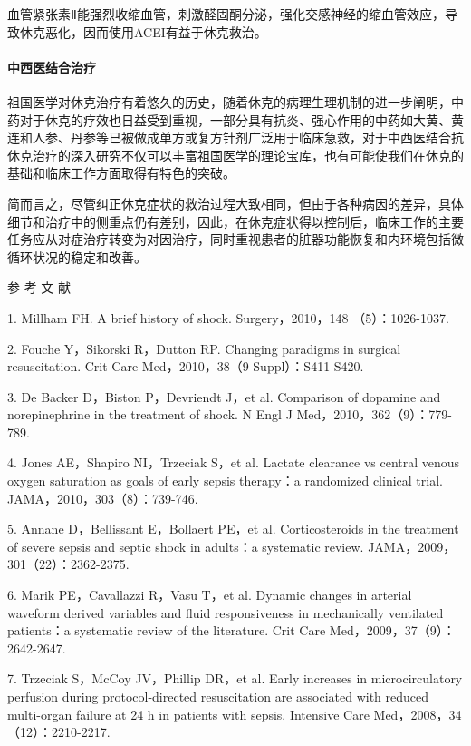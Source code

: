 血管紧张素Ⅱ能强烈收缩血管，刺激醛固酮分泌，强化交感神经的缩血管效应，导致休克恶化，因而使用ACEI有益于休克救治。

\paragraph{中西医结合治疗}

祖国医学对休克治疗有着悠久的历史，随着休克的病理生理机制的进一步阐明，中药对于休克的疗效也日益受到重视，一部分具有抗炎、强心作用的中药如大黄、黄连和人参、丹参等已被做成单方或复方针剂广泛用于临床急救，对于中西医结合抗休克治疗的深入研究不仅可以丰富祖国医学的理论宝库，也有可能使我们在休克的基础和临床工作方面取得有特色的突破。

简而言之，尽管纠正休克症状的救治过程大致相同，但由于各种病因的差异，具体细节和治疗中的侧重点仍有差别，因此，在休克症状得以控制后，临床工作的主要任务应从对症治疗转变为对因治疗，同时重视患者的脏器功能恢复和内环境包括微循环状况的稳定和改善。

\protect\hypertarget{text00056.html}{}{}

\hypertarget{text00056.htmlux5cux23CHP2-1-4}{}
参 考 文 献

1. Millham FH. A brief history of shock. Surgery，2010，148
（5）：1026-1037.

2. Fouche Y，Sikorski R，Dutton RP. Changing paradigms in surgical
resuscitation. Crit Care Med，2010，38（9 Suppl）：S411-S420.

3. De Backer D，Biston P，Devriendt J，et al. Comparison of dopamine and
norepinephrine in the treatment of shock. N Engl J
Med，2010，362（9）：779-789.

4. Jones AE，Shapiro NI，Trzeciak S，et al. Lactate clearance vs central
venous oxygen saturation as goals of early sepsis therapy：a randomized
clinical trial. JAMA，2010，303（8）：739-746.

5. Annane D，Bellissant E，Bollaert PE，et al. Corticosteroids in the
treatment of severe sepsis and septic shock in adults：a systematic
review. JAMA，2009，301（22）：2362-2375.

6. Marik PE，Cavallazzi R，Vasu T，et al. Dynamic changes in arterial
waveform derived variables and fluid responsiveness in mechanically
ventilated patients：a systematic review of the literature. Crit Care
Med，2009，37（9）：2642-2647.

7. Trzeciak S，McCoy JV，Phillip DR，et al. Early increases in
microcirculatory perfusion during protocol-directed resuscitation are
associated with reduced multi-organ failure at 24 h in patients with
sepsis. Intensive Care Med，2008，34 （12）：2210-2217.

